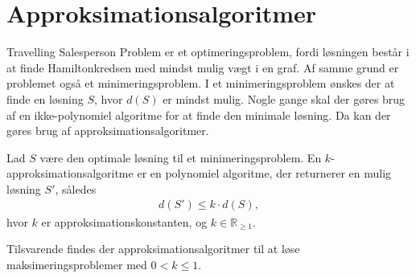 \section{Approksimationsalgoritmer}
Travelling Salesperson Problem er et optimeringsproblem, fordi løsningen består i at finde Hamiltonkredsen med mindst mulig vægt i en graf. 
Af samme grund er problemet også et minimeringsproblem. 
I et minimeringsproblem ønskes der at finde en løsning $S$, hvor $d(S)$ er mindst mulig.
Nogle gange skal der gøres brug af en ikke-polynomiel algoritme for at finde den minimale løsning.
Da kan der gøres brug af approksimationsalgoritmer.

\begin{defn}\label{def:apk}
Lad $S$ være den optimale løsning til et minimeringsproblem. En $k$-approksimationsalgoritme er en polynomiel algoritme, der returnerer en mulig løsning $S'$, således
\begin{align*}
d(S') \leq k \cdot d(S),
\end{align*}
hvor $k$ er approksimationskonstanten, og $k \in \mathbb{R}_{\geq 1}$.
\end{defn}

Tilsvarende findes der approksimationsalgoritmer til at løse maksimeringsproblemer med $0 < k \leq 1$. \citep{approksalg}
